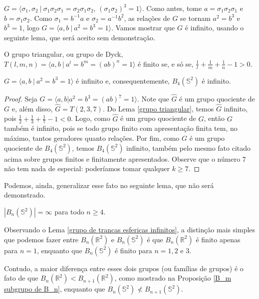 	$G = \langle \sigma_1, \sigma_2 \ | \ \sigma_1\sigma_2\sigma_1 = \sigma_2\sigma_1\sigma_2\text{, }
	(\sigma_1\sigma_2)^3 = 1 \rangle$. Como antes, tome 
	$a = \sigma_1\sigma_2\sigma_1$ e $b = \sigma_1\sigma_2$. Como $\sigma_1 = b^{-1}a$ 
	e $\sigma_2 = a^{-1}b^2$, as relações de $G$ se tornam $a^2 = b^3$ e $b^3 = 1$, logo 
	$G = \langle a,b \ | \ a^2=b^3=1 \rangle$. 
	Vamos mostrar que $G$ é infinito, usando o seguinte lema, que será aceito sem demonstração.
	\begin{lemma}
	\label{grupo triangular}
		O grupo triangular, ou grupo de Dyck, $T(l,m,n) = \langle a,b \ | \ a^l=b^m=(ab)^n=1 \rangle$ 
		é finito se, e só se, $\displaystyle{\frac{1}{l} + \frac{1}{m} + \frac{1}{n} - 1 > 0}$.
	\end{lemma}
	\begin{prop}
	\label{quociente de B4(S2) infinito}
		$G = \langle a,b \ | \ a^2=b^3=1 \rangle$ é infinito e, consequentemente, 
		$B_4(\mathbb{S}^2)$ é infinito.
	\end{prop}
	\begin{proof}
		Seja $\widehat{G} = \langle a,b|a^2=b^3=(ab)^7=1 \rangle$. Note que $\widehat{G}$ 
		é um grupo quociente de $G$ e, além disso, $\widehat{G} = T(2,3,7)$. 
		Do Lema \ref{grupo triangular}, temos $\widehat{G}$ infinito, pois 
		$\displaystyle{\frac{1}{2} + \frac{1}{3} + \frac{1}{7} - 1 < 0}$. Logo, como 
		$\widehat{G}$ é um grupo quociente de $G$, então $G$ também é infinito, pois se todo 
		grupo finito com apresentação finita tem, no máximo, tantos geradores quanto relações. 
		Por fim, como $G$ é um grupo quociente de $B_4(\mathbb{S}^2)$, temos $B_4(\mathbb{S}^2)$ 
		infinito, também pelo mesmo fato citado acima sobre grupos finitos e finitamente apresentados.
		Observe que o número $7$ não tem nada de especial: poderíamos tomar qualquer $k\geq 7$.
	\end{proof}
	Podemos, ainda, generalizar esse fato no seguinte lema, que não será demonstrado.
	\begin{lemma}
	\label{grupo de trancas esfericas infinitos}
		$|B_n(\mathbb{S}^2)| = \infty$ para todo $n\geq 4$.
	\end{lemma}
	Observando o Lema \ref{grupo de trancas esfericas infinitos}, a distinção mais simples 
	que podemos fazer entre $B_n(\mathbb{R}^2)$ e $B_n(\mathbb{S}^2)$ é que 
	$B_n(\mathbb{R}^2)$ é finito apenas para $n=1$, enquanto que $B_n(\mathbb{S}^2)$ 
	é finito para $n=1,2$ e $3$.
	
	\par\vspace{0.3cm} Contudo, a maior diferença entre esses dois grupos 
	(ou famílias de grupos) é o fato de que $B_n(\mathbb{R}^2)<B_{n+1}(\mathbb{R}^2)$, 
	como mostrado na Proposição \ref{B_m subgrupo de B_n}, enquanto que 
	$B_n(\mathbb{S}^2)\nless B_{n+1}(\mathbb{S}^2)$.
	
